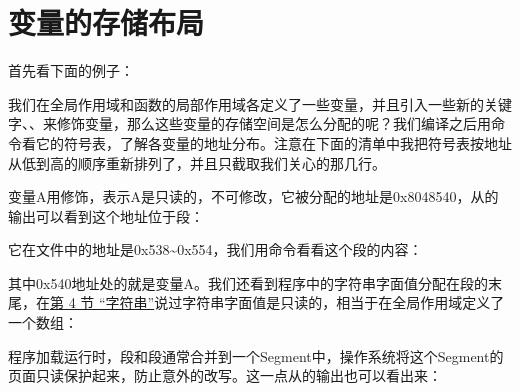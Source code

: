 


\section{变量的存储布局}
%
首先看下面的例子：





我们在全局作用域和函数的局部作用域各定义了一些变量，并且引入一些新的关键字、、来修饰变量，那么这些变量的存储空间是怎么分配的呢？我们编译之后用命令看它的符号表，了解各变量的地址分布。注意在下面的清单中我把符号表按地址从低到高的顺序重新排列了，并且只截取我们关心的那几行。




变量A用修饰，表示A是只读的，不可修改，它被分配的地址是0x8048540，从的输出可以看到这个地址位于段：




它在文件中的地址是0x538\textasciitilde{}\BookSplit{}0x554，我们用命令看看这个段的内容：




其中0x540地址处的就是变量A。我们还看到程序中的字符串字面值分配在段的末尾，在\hyperlink{db.ch08s04.id2734544}{第 4 节 “字符串”}说过字符串字面值是只读的，相当于在全局作用域定义了一个数组：




程序加载运行时，段和段通常合并到一个Segment中，操作系统将这个Segment的页面只读保护起来，防止意外的改写。这一点从的输出也可以看出来：



